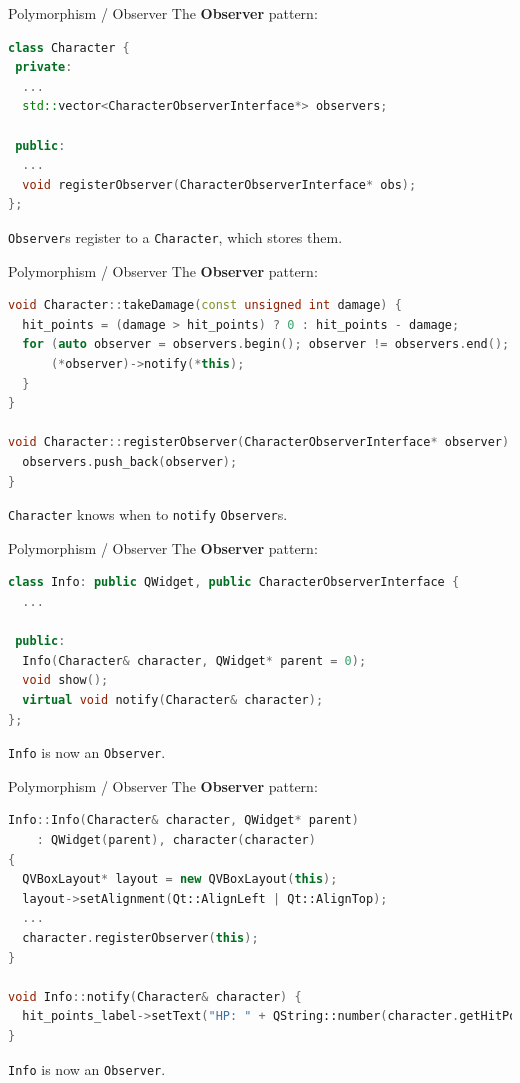 \documentclass[11pt]{beamer}
\renewcommand{\emph}[1]{\textbf{#1}}
\begin{document}
\begin{frame}[fragile]{Polymorphism / Observer}
 The \emph{Observer} pattern:

 \begin{lstlisting}[language=C++]
class Character {
 private:
  ...
  std::vector<CharacterObserverInterface*> observers;

 public:
  ...
  void registerObserver(CharacterObserverInterface* obs);
};
\end{lstlisting}

 \texttt{Observer}s register to a \texttt{Character}, which stores them.
\end{frame}

\begin{frame}[fragile]{Polymorphism / Observer}
 The \emph{Observer} pattern:

 \begin{lstlisting}[language=C++]
void Character::takeDamage(const unsigned int damage) {
  hit_points = (damage > hit_points) ? 0 : hit_points - damage;
  for (auto observer = observers.begin(); observer != observers.end(); observer++) {
      (*observer)->notify(*this);
  }
}

void Character::registerObserver(CharacterObserverInterface* observer) {
  observers.push_back(observer);
}
\end{lstlisting}

 \texttt{Character} knows when to \texttt{notify} \texttt{Observer}s.
\end{frame}

\begin{frame}[fragile]{Polymorphism / Observer}
 The \emph{Observer} pattern:

 \begin{lstlisting}[language=C++]
class Info: public QWidget, public CharacterObserverInterface {
  ...

 public:
  Info(Character& character, QWidget* parent = 0);
  void show();
  virtual void notify(Character& character);
};
\end{lstlisting}

 \texttt{Info} is now an \texttt{Observer}.
\end{frame}


\begin{frame}[fragile]{Polymorphism / Observer}
 The \emph{Observer} pattern:

 \begin{lstlisting}[language=C++]
Info::Info(Character& character, QWidget* parent)
    : QWidget(parent), character(character)
{
  QVBoxLayout* layout = new QVBoxLayout(this);
  layout->setAlignment(Qt::AlignLeft | Qt::AlignTop);
  ...
  character.registerObserver(this);
}

void Info::notify(Character& character) {
  hit_points_label->setText("HP: " + QString::number(character.getHitPoints()) + "/" + QString::number(character.getMaxHitPoints()));
}
\end{lstlisting}

 \texttt{Info} is now an \texttt{Observer}.
\end{frame}
\end{document}
